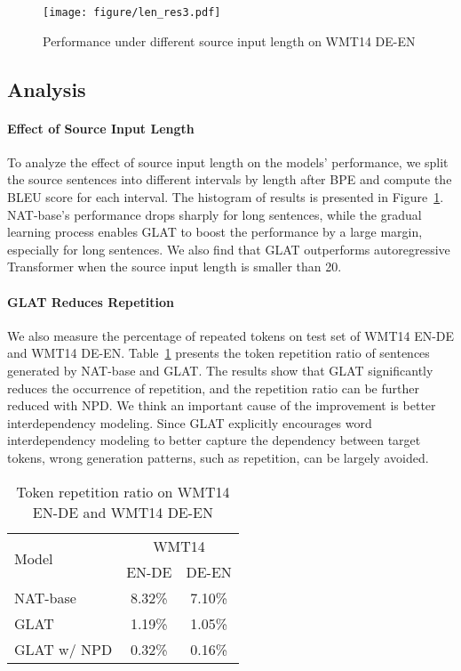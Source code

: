 \begin{figure}[!tbp]
\centering
\texttt{[image: figure/len\_res3.pdf]}
\caption{Performance under different source input length on WMT14 DE-EN}
\label{fig.len_res}
\end{figure}
\subsection{Analysis}


\paragraph{Effect of Source Input Length}
To analyze the effect of source input length on the models' performance, we split the source sentences into different intervals by length after BPE and compute the BLEU score for each interval. 
The histogram of results is presented in Figure~\ref{fig.len_res}. 
NAT-base's performance drops sharply for long sentences, while the gradual learning process enables GLAT to boost the performance by a large margin, especially for long sentences. We also find that GLAT outperforms autoregressive Transformer when the source input length is smaller than 20.

\paragraph{GLAT Reduces Repetition}
We also measure the percentage of repeated tokens on test set of WMT14 EN-DE and WMT14 DE-EN. Table~\ref{tb.repetition} presents the token repetition ratio of sentences generated by NAT-base and GLAT.
The results show that GLAT significantly reduces the occurrence of repetition, and the repetition ratio can be further reduced with NPD. We think an important cause of the improvement is better interdependency modeling. Since GLAT explicitly encourages word interdependency modeling to better capture the dependency between target tokens, wrong generation patterns, such as repetition, can be largely avoided.

\begin{table}[!tbp]
\centering
\small
\begin{tabular}{lcc}
\toprule
\multirow{2}{*}{Model} & \multicolumn{2}{c}{WMT14} \\
& EN-DE & DE-EN \\
\midrule
NAT-base & 8.32\% & 7.10\%\\
GLAT & 1.19\% & 1.05\% \\
GLAT w/ NPD & 0.32\% & 0.16\% \\
\bottomrule
\end{tabular}
\caption{Token repetition ratio on WMT14 EN-DE and WMT14 DE-EN}
\label{tb.repetition}
\end{table}

